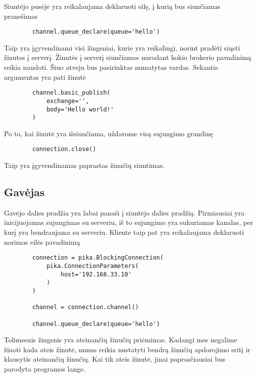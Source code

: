 \documentclass[12pt, a4paper, lithuanian]{article}
\begin{document}
    Siuntėjo pusėje yra reikalaujama deklaruoti eilę, į kurią bus siunčiamas pranešimas

    \begin{lstlisting}
        channel.queue_declare(queue='hello')
    \end{lstlisting}

    Taip yra įgyvendinami visi žingsniai, kurie yra reikalingi, norint pradėti siųsti žinutes į serverį. 
    Žinutės į serverį siunčiamos nurodant kokio brokerio pavadinimą reikia naudoti. Šiuo atveju bus pasirinktas numatytas vardas. Sekantis argumentas yra pati žinutė

    \begin{lstlisting}
        channel.basic_publish(
            exchange='',
            body='Hello world!'
        )
    \end{lstlisting}

    Po to, kai žinutė yra išsiunčiama, uždarome visą sujungimo grandinę

    \begin{lstlisting}
        connection.close()
    \end{lstlisting}

    Taip yra įgyvendinamas paprastas žinučių siuntimas.

    \subsection{Gavėjas}

    Gavėjo dalies pradžia yra labai panaši į siuntėjo dalies pradžią. Pirmiausiai yra inicijuojamas sujungimas su serveriu, iš to sujungimo yra sukuriamas kanalas, per kurį yra bendraujama su serveriu. Kliente taip pat yra reikalaujama deklaruoti norimos eilės pavadinimą

    \begin{lstlisting}
        connection = pika.BlockingConnection(
            pika.ConnectionParameters(
                host='192.168.33.10'
            )
        )

        channel = connection.channel()

        channel.queue_declare(queue='hello')
    \end{lstlisting}

    Tolimesnis žingsnis yra ateinančių žinučių priėmimas. Kadangi mes negalime žinoti kada ateis žinutė, mums reikia nustatyti bendrą žinučių apdorojimo sritį ir klausytis ateinančių žinučių. Kai tik ateis žinutė, jinai paprasčiausiai bus parodyta programos lange.
\end{document}
